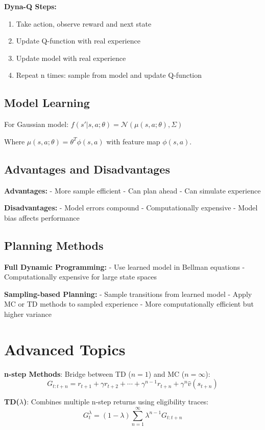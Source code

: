 \documentclass[a4paper,11pt]{article}
\newcommand{\cf}[1]{\[#1\]}
\renewcommand{\b}[1]{\textbf{#1}}
\begin{document}
\textbf{Dyna-Q Steps:}
\begin{enumerate}
\item Take action, observe reward and next state
\item Update Q-function with real experience
\item Update model with real experience  
\item Repeat n times: sample from model and update Q-function
\end{enumerate}

\subsection{Model Learning}
For Gaussian model: $f(s'|s,a;\theta) = \mathcal{N}(\mu(s,a;\theta), \Sigma)$

Where $\mu(s,a;\theta) = \theta^T \phi(s,a)$ with feature map $\phi(s,a)$.

\subsection{Advantages and Disadvantages}
\textbf{Advantages:}
- More sample efficient
- Can plan ahead
- Can simulate experience

\textbf{Disadvantages:}
- Model errors compound
- Computationally expensive
- Model bias affects performance

\subsection{Planning Methods}
\textbf{Full Dynamic Programming:}
- Use learned model in Bellman equations
- Computationally expensive for large state spaces

\textbf{Sampling-based Planning:}
- Sample transitions from learned model
- Apply MC or TD methods to sampled experience
- More computationally efficient but higher variance

\section{Advanced Topics}

\b{n-step Methods}: Bridge between TD ($n=1$) and MC ($n=\infty$):
\cf{G_{t:t+n} = r_{t+1} + \gamma r_{t+2} + \cdots + \gamma^{n-1} r_{t+n} + \gamma^n \hat{v}(s_{t+n})}

\textbf{TD($\lambda$)}: Combines multiple n-step returns using eligibility traces:
\cf{G_t^\lambda = (1-\lambda) \sum_{n=1}^{\infty} \lambda^{n-1} G_{t:t+n}}
\end{document}
